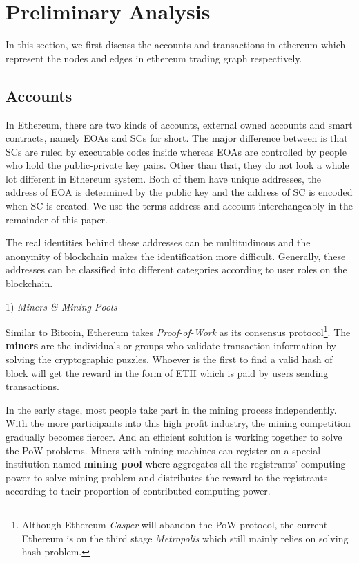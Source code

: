 
\section{Preliminary Analysis}
In this section, we first discuss the accounts and transactions in ethereum which represent the nodes and edges in ethereum trading graph respectively. 

\subsection{Accounts}
In Ethereum, there are two kinds of accounts, external owned accounts and smart contracts, namely EOAs and SCs for short. The major difference between is that SCs are ruled by executable codes inside whereas EOAs are controlled by people who hold the public-private key pairs. Other than that, they do not look a whole lot different in Ethereum system. Both of them have unique addresses, the address of EOA is determined by the public key and the address of SC is encoded when SC is created. We use the terms address and account interchangeably in the remainder of this paper.

The real identities behind these addresses can be multitudinous and the anonymity of blockchain makes the identification more difficult. Generally,  these addresses can be classified into different categories according to user roles on the blockchain.


1) \emph{Miners \& Mining Pools}

Similar to Bitcoin, Ethereum takes \emph{Proof-of-Work} as its consensus protocol\footnote{Although Ethereum \emph{Casper} will abandon the PoW protocol, the current Ethereum is on the third stage \emph{Metropolis} which still mainly relies on solving hash problem.}. The \textbf{miners} are the individuals or groups who validate transaction information by solving the cryptographic puzzles. Whoever is the first to find a valid hash of block will get the reward in the form of ETH which is paid by users sending transactions.

In the early stage, most people take part in the mining process independently. With the more participants into this high profit industry, the mining competition gradually becomes fiercer. And an efficient solution is working together to solve the PoW problems. Miners with mining machines can register on a special institution named \textbf{mining pool} where aggregates all the registrants' computing power to solve mining problem and distributes the reward to the registrants according to their proportion of contributed computing power.

